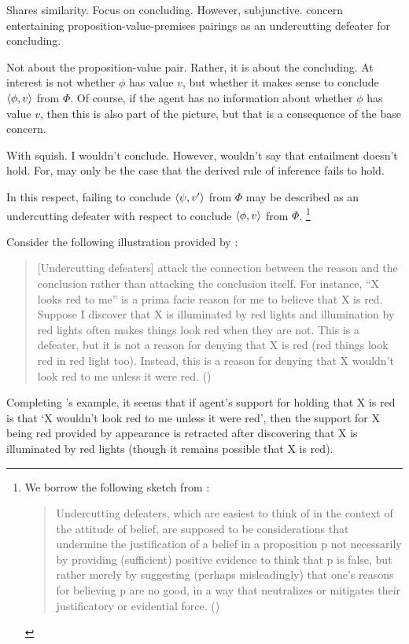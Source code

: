 \begin{note}
  Shares similarity.
  Focus on concluding.
  However, subjunctive.
   concern entertaining proposition-value-premises pairings as an undercutting defeater for concluding.
\end{note}

\begin{note}
  Not about the proposition-value pair.
  Rather, it is about the concluding.
  At interest is not whether \(\phi\) has value \(v\), but whether it makes sense to conclude \(\langle \phi, v \rangle\) from \(\Phi\).
  Of course, if the agent has no information about whether \(\phi\) has value \(v\), then this is also part of the picture, but that is a consequence of the base concern.

  With squish.
  I wouldn't conclude.
  However, wouldn't say that entailment doesn't hold.
  For, may only be the case that the derived rule of inference fails to hold.
\end{note}

\begin{note}
  In this respect, failing to conclude \(\langle \psi, v' \rangle\) from \(\Phi\) may be described as an undercutting defeater with respect to conclude \(\langle \phi, v \rangle\) from \(\Phi\).%
  \footnote{
    We borrow the following sketch from \textcite{Worsnip:2018aa}:
  \begin{quote}
    Undercutting defeaters, which are easiest to think of in the context of the attitude of belief, are supposed to be considerations that undermine the justification of a belief in a proposition p not necessarily by providing (sufficient) positive evidence to think that p is false, but rather merely by suggesting (perhaps misleadingly) that one’s reasons for believing p are no good, in a way that neutralizes or mitigates their justificatory or evidential force.%
    \mbox{}\hfill\mbox{(\citeyear[29]{Worsnip:2018aa})}
  \end{quote}
  }

  Consider the following illustration provided by \citeauthor{Pollock:1987un}:
  \begin{quote}
    [Undercutting defeaters] attack the connection between the reason and the conclusion rather than attacking the conclusion itself.
    For instance, ``X looks red to me'' is a prima facie reason for me to believe that X is red.
    Suppose I discover that X is illuminated by red lights and illumination by red lights often makes things look red when they are not.
    This is a defeater, but it is not a reason for denying that X is red (red things look red in red light too).
    Instead, this is a reason for denying that X wouldn't look red to me unless it were red.%
    \mbox{}\hfill\mbox{(\citeyear[485]{Pollock:1987un})}
  \end{quote}
  Completing \citeauthor{Pollock:1987un}'s example, it seems that if agent's support for holding that X is red is that `X wouldn't look red to me unless it were red', then the support for X being red provided by appearance is retracted after discovering that X is illuminated by red lights (though it remains possible that X is red).
\end{note}

